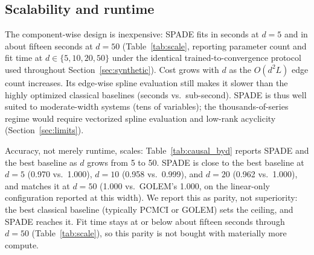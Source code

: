 \subsection{Scalability and runtime}
\label{sec:scalability}

The component-wise design is inexpensive: SPADE fits in seconds at $d{=}5$ and in
about fifteen seconds at $d{=}50$ (Table~\ref{tab:scale}, reporting parameter
count and fit time at $d\in\{5,10,20,50\}$ under the identical
trained-to-convergence protocol used throughout Section~\ref{sec:synthetic}).
Cost grows with $d$ as the $O(d^2 L)$ edge count increases. Its edge-wise spline
evaluation still makes it slower than the highly optimized classical baselines
(seconds vs.\ sub-second). SPADE is thus well suited to moderate-width systems
(tens of variables); the thousands-of-series regime would require vectorized
spline evaluation and low-rank acyclicity (Section~\ref{sec:limits}).

\begin{table}[t]
\centering
\caption{SPADE parameter count and fit time vs.\ graph width $d$
(150 epochs, 4-core CPU). The vectorized implementation fits $d{=}50$ in seconds.}
\label{tab:scale}
\end{table}

Accuracy, not merely runtime, scales: Table~\ref{tab:causal_byd} reports SPADE and
the best baseline as $d$ grows from 5 to 50. SPADE is close to the best baseline
at $d{=}5$ (0.970 vs.\ 1.000), $d{=}10$ (0.958 vs.\ 0.999), and $d{=}20$ (0.962
vs.\ 1.000), and matches it at $d{=}50$ (1.000 vs.\ GOLEM's 1.000, on the
linear-only configuration reported at this width). We report this as parity, not
superiority: the best classical baseline (typically PCMCI or GOLEM) sets the
ceiling, and SPADE reaches it. Fit time stays at or below about fifteen seconds
through $d{=}50$ (Table~\ref{tab:scale}), so this parity is not bought with
materially more compute.

\begin{table}[t]
\centering
\caption{Scaling of causal-discovery accuracy with graph width $d$
(mean over linear/non-linear settings, 3 seeds). SPADE matches or is close
to the best baseline at every width tested, $d\in\{5,10,20,50\}$; see text for the
benchmark safeguard and the width-dependent $\lambda_g$ used.}
\label{tab:causal_byd}
\end{table}

